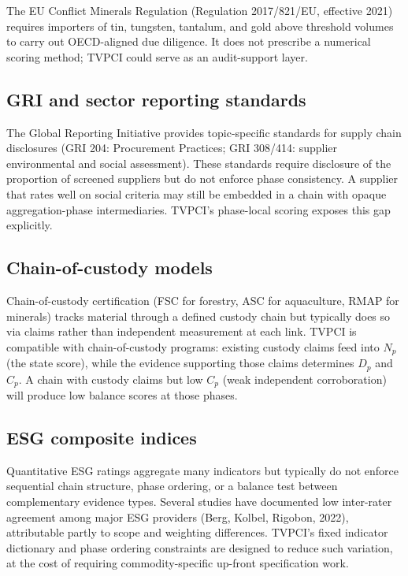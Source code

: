 \documentclass[12pt]{article}
\begin{document}
The EU Conflict Minerals Regulation (Regulation 2017/821/EU, effective
2021) requires importers of tin, tungsten, tantalum, and gold above
threshold volumes to carry out OECD-aligned due diligence. It does not
prescribe a numerical scoring method; TVPCI could serve as an
audit-support layer.

\subsection{GRI and sector reporting standards}\label{gri-and-sector-reporting-standards}

The Global Reporting Initiative provides topic-specific standards for
supply chain disclosures (GRI 204: Procurement Practices; GRI 308/414:
supplier environmental and social assessment). These standards require
disclosure of the proportion of screened suppliers but do not enforce
phase consistency. A supplier that rates well on social criteria may
still be embedded in a chain with opaque aggregation-phase
intermediaries. TVPCI's phase-local scoring exposes this gap explicitly.

\subsection{Chain-of-custody models}\label{chain-of-custody-models}

Chain-of-custody certification (FSC for forestry, ASC for aquaculture,
RMAP for minerals) tracks material through a defined custody chain but
typically does so via claims rather than independent measurement at each
link. TVPCI is compatible with chain-of-custody programs: existing
custody claims feed into \(N_p\) (the state score), while the evidence
supporting those claims determines \(D_p\) and \(C_p\). A chain with
custody claims but low \(C_p\) (weak independent corroboration) will
produce low balance scores at those phases.

\subsection{ESG composite indices}\label{esg-composite-indices}

Quantitative ESG ratings aggregate many indicators but typically do not
enforce sequential chain structure, phase ordering, or a balance test
between complementary evidence types. Several studies have documented
low inter-rater agreement among major ESG providers (Berg, Kolbel,
Rigobon, 2022), attributable partly to scope and weighting differences.
TVPCI's fixed indicator dictionary and phase ordering constraints are
designed to reduce such variation, at the cost of requiring
commodity-specific up-front specification work.
\end{document}
